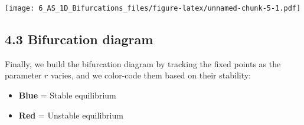\documentclass[
]{article}
\providecommand{\tightlist}{%
  \setlength{\itemsep}{0pt}\setlength{\parskip}{0pt}}
\begin{document}
\texttt{[image: 6\_AS\_1D\_Bifurcations\_files/figure-latex/unnamed-chunk-5-1.pdf]}

\subsection{\texorpdfstring{\textbf{4.3 Bifurcation
diagram}}{4.3 Bifurcation diagram}}\label{bifurcation-diagram-3}

Finally, we build the bifurcation diagram by tracking the fixed points
as the parameter \(r\) varies, and we color-code them based on their
stability:

\begin{itemize}
\tightlist
\item
  \textbf{Blue} = Stable equilibrium
\item
  \textbf{Red} = Unstable equilibrium
\end{itemize}
\end{document}

